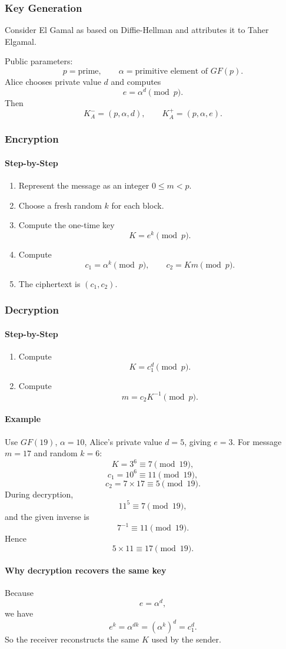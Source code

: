\documentclass[12pt]{article}
\newcommand{\Step}{\paragraph{Step-by-Step}}
\newcommand{\Example}{\paragraph{Example}}
\begin{document}
\subsubsection{Key Generation}
Consider El Gamal as based on Diffie-Hellman and attributes it to Taher Elgamal.

Public parameters:
\[
p=\text{prime},\qquad \alpha=\text{primitive element of }GF(p).
\]
Alice chooses private value $d$ and computes
\[
e=\alpha^d\pmod p.
\]
Then
\[
K_A^-=(p,\alpha,d),
\qquad
K_A^+=(p,\alpha,e).
\]

\subsubsection{Encryption}
\Step
\begin{enumerate}
    \item Represent the message as an integer $0\le m<p$.
    \item Choose a fresh random $k$ for each block.
    \item Compute the one-time key
    \[
    K=e^k\pmod p.
    \]
    \item Compute
    \[
    c_1=\alpha^k\pmod p,
    \qquad
    c_2=Km\pmod p.
    \]
    \item The ciphertext is $(c_1,c_2)$.
\end{enumerate}

\subsubsection{Decryption}
\Step
\begin{enumerate}
    \item Compute
    \[
    K=c_1^d\pmod p.
    \]
    \item Compute
    \[
    m=c_2K^{-1}\pmod p.
    \]
\end{enumerate}

\Example Use $GF(19)$, $\alpha=10$, Alice's private value $d=5$, giving $e=3$. For message $m=17$ and random $k=6$:
\[
K=3^6\equiv7\pmod{19},
\]
\[
c_1=10^6\equiv11\pmod{19},
\]
\[
c_2=7\times17\equiv5\pmod{19}.
\]
During decryption,
\[
11^5\equiv7\pmod{19},
\]
and the given inverse is
\[
7^{-1}\equiv11\pmod{19}.
\]
Hence
\[
5\times11\equiv17\pmod{19}.
\]

\paragraph{Why decryption recovers the same key}
Because
\[
e=\alpha^d,
\]
we have
\[
e^k=\alpha^{dk}=(\alpha^k)^d=c_1^d.
\]
So the receiver reconstructs the same $K$ used by the sender.
\end{document}
